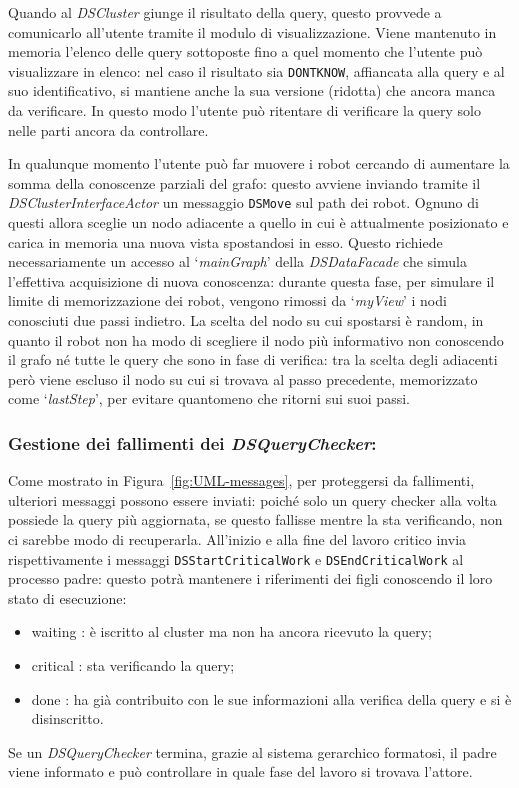 Quando al \emph{DSCluster} giunge il risultato della query,
questo provvede a comunicarlo all'utente tramite il modulo di
visualizzazione. Viene mantenuto in memoria l'elenco delle
query sottoposte fino a quel momento che l'utente può visualizzare
in elenco: nel caso il risultato sia \texttt{DONTKNOW}, affiancata
alla query e al suo identificativo, si mantiene anche la sua versione
(ridotta) che ancora manca da verificare. In questo modo
l'utente può ritentare di verificare la query solo nelle parti
ancora da controllare.

In qualunque momento l'utente può far muovere i robot cercando di
aumentare la somma della conoscenze parziali del grafo: questo
avviene inviando tramite il \emph{DSClusterInterfaceActor} un
messaggio \texttt{DSMove} sul path dei robot.
Ognuno di questi allora sceglie un nodo adiacente
a quello in cui è attualmente posizionato e carica in memoria
una nuova vista spostandosi in esso.
Questo richiede necessariamente un accesso al `\emph{mainGraph}' della
\emph{DSDataFacade} che simula l'effettiva acquisizione di
nuova conoscenza: durante questa fase, per simulare il limite di
memorizzazione dei robot, vengono rimossi da `\emph{myView}'
i nodi conosciuti due passi indietro.
La scelta del nodo su cui spostarsi è random, in quanto il robot
non ha modo di scegliere il nodo più informativo non conoscendo
il grafo né tutte le query che sono in fase di verifica:
tra la scelta degli adiacenti però viene escluso il nodo su cui
si trovava al passo precedente, memorizzato come
`\emph{lastStep}', per evitare quantomeno che ritorni sui suoi passi.

\subsubsection*{Gestione dei fallimenti dei \emph{DSQueryChecker}:}
Come mostrato in Figura~\ref{fig:UML-messages},
per proteggersi da fallimenti, ulteriori messaggi possono essere
inviati: poiché solo un query checker alla volta possiede la query
più aggiornata, se questo fallisse mentre la sta verificando,
non ci sarebbe modo di recuperarla.
All'inizio e alla fine del lavoro critico invia rispettivamente i
messaggi \texttt{DSStartCriticalWork} e \texttt{DSEndCriticalWork}
al processo padre: questo potrà mantenere i riferimenti dei
figli conoscendo il loro stato di esecuzione:\begin{itemize}
\item waiting : è iscritto al cluster ma non ha ancora ricevuto la query;
\item critical : sta verificando la query;
\item done : ha già contribuito con le sue informazioni alla verifica
  della query e si è disinscritto.
\end{itemize}
Se un \emph{DSQueryChecker} termina, grazie al sistema gerarchico
formatosi, il padre viene informato e può controllare in quale fase del
lavoro si trovava l'attore.

